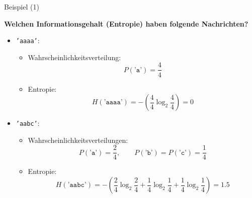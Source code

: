 \begin{frame}{Beispiel (1)}

\textbf{Welchen Informationsgehalt (Entropie) haben folgende Nachrichten?}\\[1em]

\begin{itemize}[<+->]
    \item \texttt{'aaaa'}: 
        \begin{itemize}
            \item Wahrscheinlichkeitsverteilung: 
            \[P(\texttt{'a'}) = \frac{4}{4}\]        
            \item Entropie:
    \[H(\texttt{'aaaa'}) = - \left( \frac{4}{4} \log_2 \frac{4}{4} \right) = 0 \]
        \end{itemize}   
    \item \texttt{'aabc'}: 
        \begin{itemize}[<+->]
            \item Wahrscheinlichkeitsverteilungen: 
            \[P(\texttt{'a'}) = \frac{2}{4}, \qquad P(\texttt{'b'}) = P(\texttt{'c'}) = \frac{1}{4}\]        
            \item Entropie:
    \[H(\texttt{'aabc'}) = - \left( \frac{2}{4} \log_2 \frac{2}{4} + \frac{1}{4} \log_2 \frac{1}{4} + \frac{1}{4} \log_2 \frac{1}{4} \right) = 1.5 \]        
        \end{itemize}        
\end{itemize}

\end{frame}



